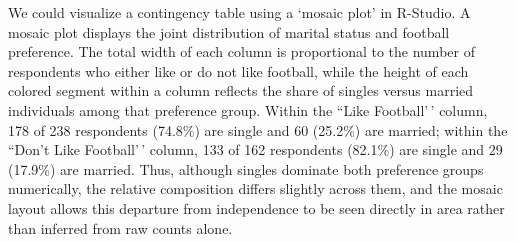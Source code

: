 \documentclass[
  letterpaper,
  DIV=11,
  numbers=noendperiod]{scrreprt}
\begin{document}
We could visualize a contingency table using a `mosaic plot' in
R-Studio. A mosaic plot displays the joint distribution of marital
status and football preference. The total width of each column is
proportional to the number of respondents who either like or do not like
football, while the height of each colored segment within a column
reflects the share of singles versus married individuals among that
preference group. Within the ``Like Football'\,' column, 178 of 238
respondents (74.8\%) are single and 60 (25.2\%) are married; within the
``Don't Like Football'\,' column, 133 of 162 respondents (82.1\%) are
single and 29 (17.9\%) are married. Thus, although singles dominate both
preference groups numerically, the relative composition differs slightly
across them, and the mosaic layout allows this departure from
independence to be seen directly in area rather than inferred from raw
counts alone.
\end{document}
